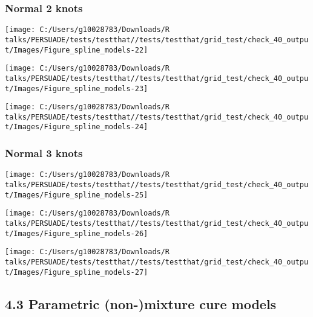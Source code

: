 \documentclass[
]{article}
\begin{document}
\subsubsection{Normal 2 knots}\label{normal-2-knots}

\begin{flushleft}\texttt{[image: C:/Users/g10028783/Downloads/R talks/PERSUADE/tests/testthat//tests/testthat/grid\_test/check\_40\_output/Images/Figure\_spline\_models-22]} \end{flushleft}

\begin{flushleft}\texttt{[image: C:/Users/g10028783/Downloads/R talks/PERSUADE/tests/testthat//tests/testthat/grid\_test/check\_40\_output/Images/Figure\_spline\_models-23]} \end{flushleft}

\begin{flushleft}\texttt{[image: C:/Users/g10028783/Downloads/R talks/PERSUADE/tests/testthat//tests/testthat/grid\_test/check\_40\_output/Images/Figure\_spline\_models-24]} \end{flushleft}

\clearpage

\subsubsection{Normal 3 knots}\label{normal-3-knots}

\begin{flushleft}\texttt{[image: C:/Users/g10028783/Downloads/R talks/PERSUADE/tests/testthat//tests/testthat/grid\_test/check\_40\_output/Images/Figure\_spline\_models-25]} \end{flushleft}

\begin{flushleft}\texttt{[image: C:/Users/g10028783/Downloads/R talks/PERSUADE/tests/testthat//tests/testthat/grid\_test/check\_40\_output/Images/Figure\_spline\_models-26]} \end{flushleft}

\begin{flushleft}\texttt{[image: C:/Users/g10028783/Downloads/R talks/PERSUADE/tests/testthat//tests/testthat/grid\_test/check\_40\_output/Images/Figure\_spline\_models-27]} \end{flushleft}

\clearpage

\subsection{4.3 Parametric (non-)mixture cure
models}\label{parametric-non-mixture-cure-models}
\end{document}
